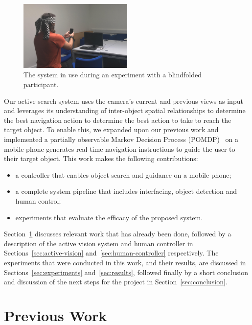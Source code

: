 \documentclass[runningheads]{llncs}
\begin{document}
\begin{figure}
  \centering
  \includegraphics[width=0.5\textwidth]{figures/system_use.png}
  \caption{The system in use during an experiment with a blindfolded participant. }\label{fig:system-in-use}
\end{figure}

Our active search system uses the camera's current and previous views as input and leverages its understanding of inter-object spatial relationships to determine the best navigation action to determine the best action to take to reach the target object.
To enable this, we expanded upon our previous work and implemented a partially observable Markov Decision Process (POMDP)~\cite{bellman1957markovian} on a mobile phone generates real-time navigation instructions to guide the user to their target object.
This work makes the following contributions:

\begin{itemize}
  \item a controller that enables object search and guidance on a mobile phone;
  \item a complete system pipeline that includes interfacing, object detection and human control;
  \item experiments that evaluate the efficacy of the proposed system.
\end{itemize}

Section~\ref{sec:previous-work} discusses relevant work that has already been done, followed by a description of the active vision system and human controller in Sections~\ref{sec:active-vision} and~\ref{sec:human-controller} respectively. 
The experiments that were conducted in this work, and their results, are discussed in Sections~\ref{sec:experiments} and~\ref{sec:results}, followed finally by a short conclusion and discussion of the next steps for the project in Section~\ref{sec:conclusion}.

\section{Previous Work}\label{sec:previous-work}
\end{document}
